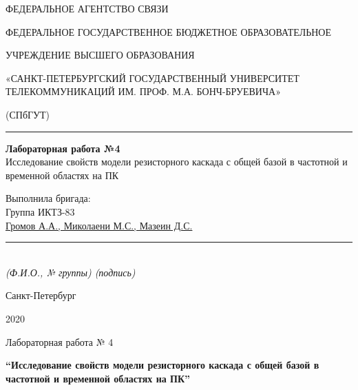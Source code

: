 \documentclass[a4paper,14pt]{extarticle}
\begin{document}
    \begin{center}
        \thispagestyle{empty}
        \begin{singlespace}
        ФЕДЕРАЛЬНОЕ АГЕНТСТВО СВЯЗИ

        ФЕДЕРАЛЬНОЕ ГОСУДАРСТВЕННОЕ БЮДЖЕТНОЕ ОБРАЗОВАТЕЛЬНОЕ

        УЧРЕЖДЕНИЕ ВЫСШЕГО ОБРАЗОВАНИЯ

        «САНКТ-ПЕТЕРБУРГСКИЙ ГОСУДАРСТВЕННЫЙ УНИВЕРСИТЕТ ТЕЛЕКОММУНИКАЦИЙ ИМ. ПРОФ. М.А. БОНЧ-БРУЕВИЧА»

        (СПбГУТ)
        \end{singlespace}
        \vspace{-1ex}
        \rule{\textwidth}{0.4pt}
        \vspace{-5ex}

        \vspace{100px}
        \textbf{Лабораторная работа №4}\\
        Исследование свойств модели резисторного каскада с общей базой в частотной и временной областях на ПК

    \vspace{100px}
    \end{center}
    \vspace{4ex}
    \begin{flushright}
    \parbox{12 cm}{
    \begin{flushleft}
        Выполнила бригада:\\
        Группа ИКТЗ-83\\
        \underline{Громов А.А., Миколаени М.С., Мазеин Д.С.} \hfill \rule[-0.85ex]{0.09\textwidth}{0.6pt}\\
        \vspace{-1ex}
        \footnotesize \textit{ (Ф.И.О., № группы) \hfill (подпись)} \normalsize


    \end{flushleft}
    }
    \end{flushright}
    \begin{center}
        \vfill
        Санкт-Петербург

        2020

    \end{center}
    \newpage


    \begin{center}
        \begin{singlespace}
             Лабораторная работа № 4

            \textbf{“Исследование свойств модели резисторного каскада с общей
            базой в частотной и временной областях на ПК”}           
        \end{singlespace}
    \end{center}
\end{document}
